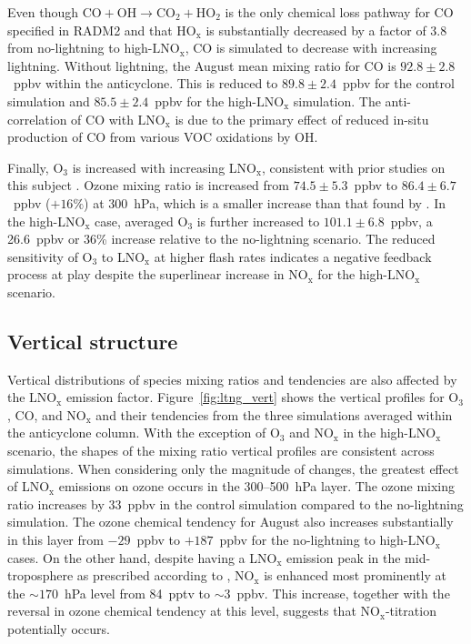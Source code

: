 Even though $\mathrm{CO+OH\rightarrow CO_2+HO_2}$ is the only
chemical loss pathway for CO specified in RADM2 and that HO$_\mathrm{x}$
is substantially decreased by a factor of 3.8 from no-lightning to high-$\mathrm{LNO_x}$,
CO is simulated to decrease with increasing lightning. Without
lightning, the August mean mixing ratio for CO is $92.8\pm2.8$~ppbv
within the anticyclone. This is reduced to $89.8\pm2.4$~ppbv for the control simulation
and $85.5\pm2.4$~ppbv for the high-$\mathrm{LNO_x}$ simulation.
The anti-correlation of CO with $\mathrm{LNO_x}$ is due to the primary
effect of reduced in-situ production of CO from various VOC oxidations
by OH.

Finally, O$_3$ is increased with increasing LNO$_\mathrm{x}$, consistent
with prior studies on this subject \citep[e.g.][]{Cooper:2007cr,Allen:2010fk}.  Ozone mixing ratio is increased from
$74.5\pm5.3$~ppbv to $86.4\pm6.7$~ppbv ($+16\%$) at 300~hPa, which is
a smaller increase than that found by \citet{Cooper:2007cr}. In the high-LNO$_{\mathrm{x}}$ case, averaged O$_3$ is
further increased to $101.1\pm6.8$~ppbv, a 26.6~ppbv or 36\% increase
relative to the no-lightning scenario. The reduced sensitivity of O$_3$ to LNO$_{\mathrm{x}}$
at higher flash rates indicates a negative feedback process at play
despite the superlinear increase in $\mathrm{NO_x}$ for the high-$\mathrm{LNO_x}$ scenario.

\subsection{Vertical structure}

Vertical distributions of species mixing ratios and tendencies are also affected by
the $\mathrm{LNO_x}$ emission factor. Figure~\ref{fig:ltng_vert} shows the vertical
profiles for O$_3$, CO, and NO$_\mathrm{x}$ and their tendencies from the three simulations
averaged within the anticyclone column. With the exception of O$_3$ and
NO$_\mathrm{x}$ in the high-LNO$_{\mathrm{x}}$ scenario, the shapes of the mixing
ratio vertical profiles are consistent across simulations. When considering only
the magnitude of changes, the greatest effect of LNO$_\mathrm{x}$ emissions
on ozone occurs in the 300--500~hPa layer. The ozone mixing ratio increases
by 33~ppbv in the control simulation compared to the no-lightning simulation.
The ozone chemical tendency for August also increases
substantially in this layer from $-29$~ppbv to $+187$~ppbv for the no-lightning to high-$\mathrm{LNO_x}$ cases.
On the other hand, despite having a LNO$_\mathrm{x}$
emission peak in the mid-troposphere as prescribed according to \citet{Ott:2010lo},
NO$_\mathrm{x}$ is enhanced most prominently at the $\sim170$~hPa level from
84~pptv to $\sim3$~ppbv. This increase, together with the reversal in ozone chemical
tendency at this level, suggests that NO$_\mathrm{x}$-titration potentially occurs.

